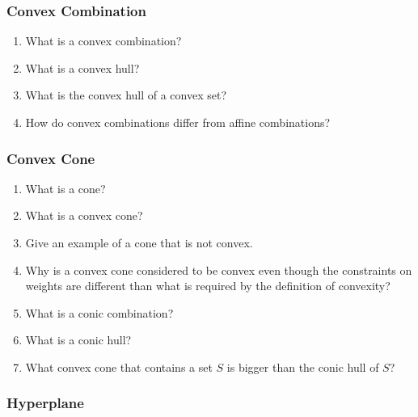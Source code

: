 \documentclass[]{article}
\newcounter{q}
\begin{document}
\subsubsection*{Convex Combination}

\begin{enumerate}[resume*]
\item What is a convex combination? 
\item What is a convex hull? 
\item What is the convex hull of a convex set? 
\item How do convex combinations differ from affine combinations?
\end{enumerate}

\subsubsection*{Convex Cone}

\begin{enumerate}[resume*]
\item What is a cone? 
\item What is a convex cone? 
\item Give an example of a cone that is not convex.
\item Why is a convex cone considered to be convex even though the constraints on weights are different than what is required by the definition of convexity? 
\item What is a conic combination? 
\item What is a conic hull? 
\item What convex cone that contains a set $S$ is bigger than the conic hull of $S$?
\end{enumerate}

\subsubsection*{Hyperplane}
\end{document}
